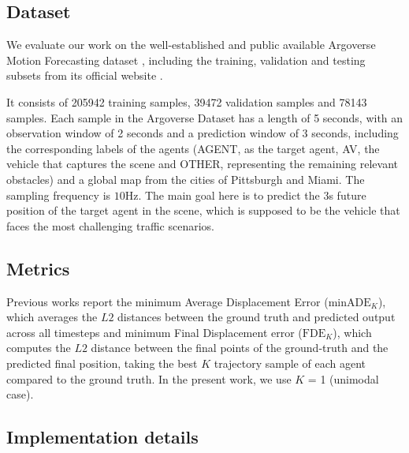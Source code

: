 \subsection{Dataset}

We evaluate our work on the well-established and public available Argoverse Motion Forecasting dataset \cite{chang2019argoverse}, including the training, validation and testing subsets from its official website \cite{argobench}. 

It consists of 205942 training samples, 39472 validation samples and 78143 samples. Each sample in the Argoverse Dataset has a length of 5 seconds, with an observation window of 2 seconds and a prediction window of 3 seconds, including the corresponding labels of the agents (AGENT, as the target agent, AV, the vehicle that captures the scene and OTHER, representing the remaining relevant obstacles) and a global map from the cities of Pittsburgh and Miami. The sampling frequency is $10\mathrm{Hz}$. The main goal here is to predict the 3s future position of the target agent in the scene, which is supposed to be the vehicle that faces the most challenging traffic scenarios.

\subsection{Metrics}

Previous works \cite{chai2019multipath, mercat2020multiattentmotion, sadeghian2019sophie} report the minimum Average Displacement Error ($\text{minADE}_K$), which averages the $L2$ distances between the ground truth and predicted output across all timesteps and minimum Final Displacement error ($\text{FDE}_K$), which computes the $L2$ distance between the final points of the ground-truth and the predicted final position, taking the best $K$ trajectory sample of each agent compared to the ground truth. In the present work, we use $K$ = 1 (unimodal case).
\\

\subsection{Implementation details}

